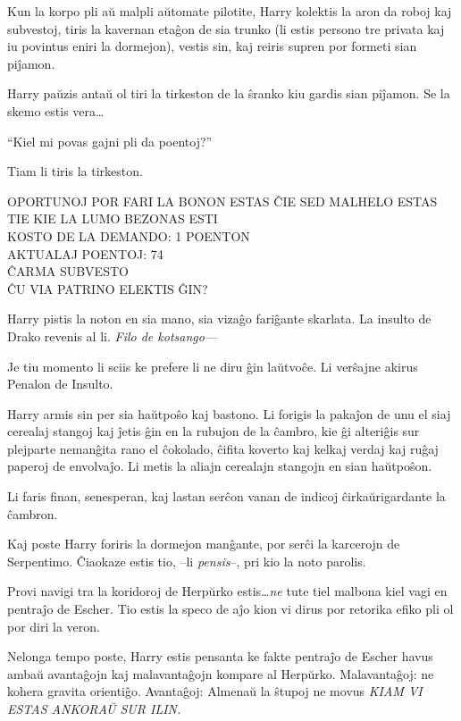 Kun la korpo pli aŭ malpli aŭtomate pilotite, Harry kolektis la aron
da roboj kaj subvestoj, tiris la kavernan etaĝon de sia trunko (li estis
persono tre privata kaj iu povintus eniri la dormejon), vestis
sin, kaj reiris supren por formeti sian piĵamon.

Harry paŭzis antaŭ ol tiri la tirkeston de la ŝranko kiu gardis sian piĵamon. Se
la skemo estis vera\ldots

``Kiel mi povas gajni pli da poentoj?''

Tiam li tiris la tirkeston.

\begin{center}
OPORTUNOJ POR FARI LA BONON ESTAS ĈIE SED MALHELO ESTAS TIE KIE LA
LUMO BEZONAS ESTI \\
KOSTO DE LA DEMANDO: 1 POENTON\\
AKTUALAJ POENTOJ: 74\\
ĈARMA SUBVESTO \\
ĈU VIA PATRINO ELEKTIS ĜIN? \\
\end{center}

Harry pistis la noton en sia mano, sia vizaĝo fariĝante skarlata. La
insulto de Drako revenis al li. \emph{Filo de kotsango—}

Je tiu momento li sciis ke prefere li ne diru ĝin laŭtvoĉe. Li
verŝajne akirus Penalon de Insulto.

Harry armis sin per sia haŭtpoŝo kaj bastono. Li forigis la pakaĵon de unu el
siaj cerealaj stangoj kaj ĵetis ĝin en la rubujon de la ĉambro, kie ĝi alteriĝis
sur plejparte nemanĝita rano el ĉokolado, ĉifita koverto kaj kelkaj verdaj kaj
ruĝaj paperoj de envolvaĵo. Li metis la aliajn cerealajn stangojn en sian
haŭtpoŝon.

Li faris finan, senesperan, kaj lastan serĉon vanan de indicoj
ĉirkaŭrigardante la ĉambron.

Kaj poste Harry foriris la dormejon manĝante, por serĉi la karcerojn de
Serpentimo. Ĉiaokaze estis tio, --li \emph{pensis}--, pri kio la noto parolis.

Provi navigi tra la koridoroj de Herpŭrko estis\ldots \emph{ne} tute tiel malbona
kiel vagi en pentraĵo de Escher. Tio estis la speco de aĵo kion vi dirus por
retorika efiko pli ol por diri la veron.

Nelonga tempo poste, Harry estis pensanta ke fakte pentraĵo de Escher
havus ambaŭ avantaĝojn kaj malavantaĝojn kompare al
Herpŭrko. Malavantaĝoj: ne kohera gravita orientiĝo. Avantaĝoj:
Almenaŭ la ŝtupoj ne movus \emph{KIAM VI ESTAS ANKORAŬ SUR ILIN.}

